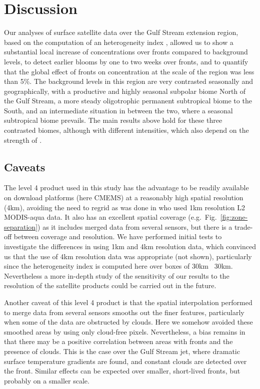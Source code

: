 \section{Discussion}

Our analyses of surface satellite data over the Gulf Stream extension region, based on the computation of an heterogeneity index , allowed us to show a substantial local increase of  concentrations over  fronts compared to background levels, to detect earlier blooms by one to two weeks over fronts, and to quantify that the global effect of fronts on  concentration at the scale of the region was less than 5\%.
The background levels in this region are very contrasted seasonally and geographically, with a productive and highly seasonal subpolar biome North of the Gulf Stream, a more steady oligotrophic permanent subtropical biome to the South, and an intermediate situation in between the two, where a seasonal subtropical biome prevails.
The main results above hold for these three contrasted biomes, although with different intensities, which also depend on the strength of .\@

\subsection{Caveats}

The level 4  product used in this study has the advantage to be readily available on download platforms (here CMEMS) at a reasonably high spatial resolution (4km), avoiding the need to regrid as was done in \textcite{liu_2016} who used 1km resolution L2 MODIS-aqua data.
It also has an excellent spatial coverage (e.g.\ Fig.~\ref{fig:zone-separation}) as it includes merged data from several sensors, but there is a trade-off between coverage and resolution.
We have performed initial tests to investigate the differences in using 1km and 4km resolution  data, which convinced us that the use of 4km resolution data was appropriate (not shown), particularly since the heterogeneity index  is computed here over boxes of 30km \texttimes\ 30km.
Nevertheless a more in-depth study of the sensitivity of our results to the resolution of the satellite products could be carried out in the future.

Another caveat of this level 4 product is that the spatial interpolation performed to merge data from several sensors smooths out the finer features, particularly when some of the data are obstructed by clouds.
Here we somehow avoided these smoothed areas by using only cloud-free  pixels.
Nevertheless, a bias remains in that there may be a positive correlation between areas with fronts and the presence of clouds.
This is the case over the Gulf Stream jet, where dramatic surface temperature gradients are found, and constant clouds are detected over the front.
Similar effects can be expected over smaller, short-lived fronts, but probably on a smaller scale.

